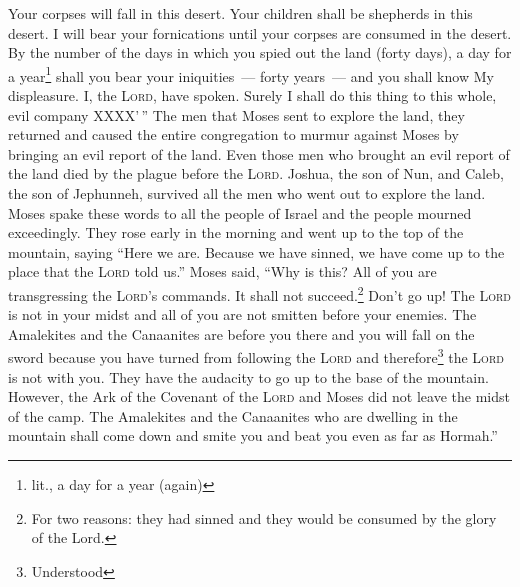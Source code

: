 \begin{inparaenum}
     Your corpses will fall in this desert.%
     Your children shall be shepherds in this desert. I will bear your fornications until your corpses are consumed in the desert.%
     By the number of the days in which you spied out the land (forty days), a day for a year\footnote{lit., a day for a year (again)} shall you bear your iniquities~--- forty years~--- and you shall know My displeasure.%
     I, the \textsc{Lord}, have spoken. Surely I shall do this thing to this whole, evil company XXXX'\,''%
     The men that Moses sent to explore the land, they returned and caused the entire congregation to murmur against Moses by bringing an evil report of the land.%
     Even those men who brought an evil report of the land died by the plague before the \textsc{Lord}.%
     Joshua, the son of Nun, and Caleb, the son of Jephunneh, survived all the men who went out to explore the land.%
     Moses spake these words to all the people of Israel and the people mourned exceedingly.%
     They rose early in the morning and went up to the top of the mountain, saying ``Here we are. Because we have sinned, we have come up to the place that the \textsc{Lord} told us.''%
     Moses said, ``Why is this? All of you are transgressing the \textsc{Lord}'s commands. It shall not succeed.\footnote{For two reasons: they had sinned and they would be consumed by the glory of the Lord.}%
     Don't go up! The \textsc{Lord} is not in your midst and all of you are not smitten before your enemies.%
     The Amalekites and the Canaanites are before you there and you will fall on the sword because you have turned from following the \textsc{Lord} and therefore\footnote{Understood} the \textsc{Lord} is not with you.%
     They have the audacity to go up to the base of the mountain. However, the Ark of the Covenant of the \textsc{Lord} and Moses did not leave the midst of the camp.%
     The Amalekites and the Canaanites who are dwelling in the mountain shall come down and smite you and beat you even as far as Hormah.''%
\end{inparaenum}
